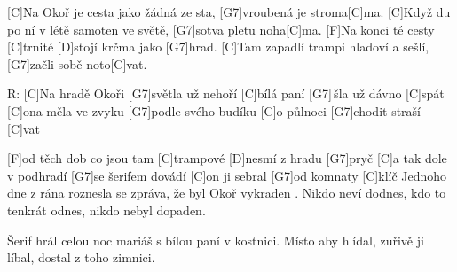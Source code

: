 
[C]Na Okoř je cesta jako žádná ze sta,
[G7]vroubená je stroma[C]ma.
[C]Když du po ní v létě samoten ve světě,
[G7]sotva pletu noha[C]ma. 
[F]Na konci té cesty [C]trnité
[D]stojí krčma jako [G7]hrad.
[C]Tam zapadlí trampi hladoví a sešlí,
[G7]začli sobě noto[C]vat.

R: [C]Na hradě Okoři [G7]světla už nehoří 
[C]bílá paní [G7]\,šla už dávno [C]spát 
[C]ona měla ve zvyku [G7]podle svého budíku 
[C]o půlnoci [G7]chodit straší [C]vat 

[F]od těch dob co jsou tam [C]trampové 
[D]nesmí z hradu [G7]pryč 
[C]a tak dole v podhradí [G7]se šerifem dovádí 
[C]on ji sebral [G7]od komnaty [C]klíč 
\columnbreak
Jednoho dne z rána roznesla se zpráva, 
že byl Okoř vykraden .
Nikdo neví dodnes, kdo to tenkrát odnes,
nikdo nebyl dopaden.

Šerif hrál celou noc mariáš 
s bílou paní v kostnici. 
Místo aby hlídal, zuřivě ji líbal,
dostal z toho zimnici.